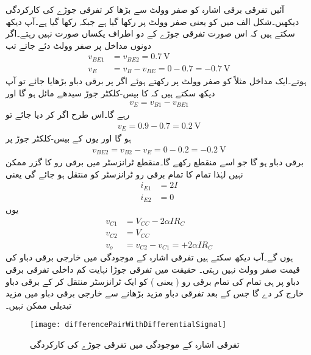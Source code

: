 آئیں تفرقی برقی اشارہ کو صفر وولٹ سے بڑھا کر تفرقی جوڑے کی کارکردگی دیکھیں۔شکل  الف میں   کو   یعنی صفر وولٹ پر رکھا گیا ہے جبکہ  رکھا گیا ہے۔آپ دیکھ سکتے ہیں کہ اس صورت تفرقی جوڑے کے دو اطراف یکساں صورت نہیں رہتے۔اگر دونوں مداخل پر صفر وولٹ دئے جاتے تب
\begin{align*}
v_{BE1}&=v_{BE2}=\SI{0.7}{\volt}\\
v_E&=v_B - v_{BE}=0-0.7=\SI{-0.7}{\volt}
\end{align*}
ہوتے۔ایک مداخل مثلاً   کو صفر وولٹ پر رکھتے ہوئے اگر   پر برقی دباو بڑھایا جائے تو آپ دیکھ سکتے ہیں کہ  کا بیس-کلکٹر  جوڑ سیدھے مائل ہو گا اور
\begin{align*}
v_E=v_{B1}-v_{BE1}
\end{align*}
رہے گا۔اس طرح اگر  کر دیا جائے تو
\begin{align*}
v_E=0.9-0.7=\SI{+0.2}{\volt}
\end{align*}
ہو گا اور یوں  کے بیس-کلکٹر  جوڑ پر
\begin{align*}
v_{BE2}=v_{B2}-v_E=0-0.2=\SI{-0.2}{\volt}
\end{align*}
برقی دباو ہو گا جو اسے منقطع رکھے گا۔منقطع ٹرانزسٹر میں برقی رو کا گزر ممکن نہیں لہٰذا تمام کا تمام   برقی رو ٹرانزسٹر  کو منتقل ہو جائے گی یعنی
\begin{align*}
i_{E1}&=2 I\\
i_{E2}&=0
\end{align*}
یوں
\begin{align*}
v_{C1}&=V_{CC}-2 \alpha I R_C\\
v_{C2}&=V_{CC}\\
v_o&=v_{C2}-v_{C1}=+2 \alpha I R_C
\end{align*}
ہوں  گے۔آپ دیکھ سکتے ہیں تفرقی اشارہ کے موجودگی میں خارجی برقی دباو  کی قیمت صفر وولٹ نہیں رہتی۔ حقیقت میں  تفرقی جوڑا نہایت کم داخلی تفرقی برقی دباو پر ہی تمام کی تمام برقی رو ( یعنی  ) کو ایک ٹرانزسٹر منتقل کر کے   برقی دباو خارج کر دے گا جس کے بعد تفرقی دباو مزید بڑھانے سے خارجی برقی دباو  میں مزید تبدیلی ممکن نہیں۔
\begin{figure}
\centering
\texttt{[image: differencePairWithDifferentialSignal]}
\caption{ تفرقی اشارہ کے موجودگی میں تفرقی جوڑے کی کارکردگی}
\label{شکل_تفرقی_اشارے_کی_موجودگی_میں_تفرقی_جوڑے_کی_کارکردگی}
\end{figure}
